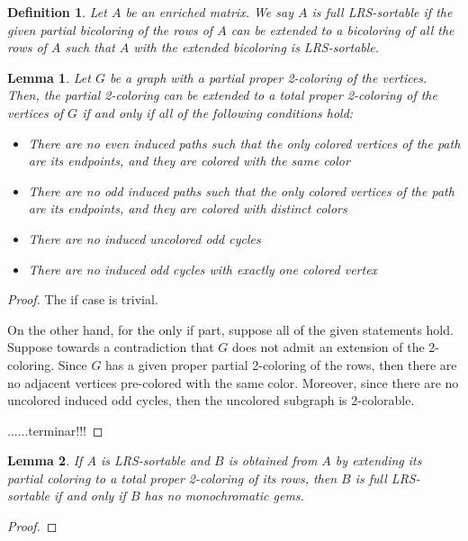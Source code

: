 \documentclass[a4paper,10pt]{report}
\theoremstyle{plain}
\newtheorem{lema}{Lemma}
\theoremstyle{remark}
\theoremstyle{plain}
\newtheorem{defn}{Definition}[chapter]
\begin{document}
{\begin{defn}
	Let $A$ be an enriched matrix. We say $A$ is \emph{full LRS-sortable} if the given partial bicoloring of the rows of $A$ can be extended to a bicoloring of all the rows of $A$ such that $A$ with the extended bicoloring is LRS-sortable.
\end{defn} \label{def_full_LR}

\begin{lema} \label{lema:2-color-extension}
	Let $G$ be a graph with a partial proper 2-coloring of the vertices. Then, the partial 2-coloring can be extended to a total proper 2-coloring of the vertices of $G$ if and only if all of the following conditions hold:
	\begin{itemize}
		\item There are no even induced paths such that the only colored vertices of the path are its endpoints, and they are colored with the same color
		\item There are no odd induced paths such that the only colored vertices of the path are its endpoints, and they are colored with distinct colors
		\item There are no induced uncolored odd cycles
		\item There are no induced odd cycles with exactly one colored vertex
	\end{itemize}	  
\end{lema}

\begin{proof}
The if case is trivial.

On the other hand, for the only if part, suppose all of the given statements hold.
Suppose towards a contradiction that $G$ does not admit an extension of the 2-coloring. Since $G$ has a given proper partial 2-coloring of the rows, then there are no adjacent vertices pre-colored with the same color.
Moreover, since there are no uncolored induced odd cycles, then the uncolored subgraph is 2-colorable. 


......terminar!!!
	
\end{proof}

\begin{lema}
	If $A$ is LRS-sortable and $B$ is obtained from $A$ by extending its partial coloring to a total proper 2-coloring of its rows, then $B$ is full LRS-sortable if and only if $B$ has no monochromatic gems.
\end{lema}

\begin{proof}
	

\end{proof}}
\end{document}
